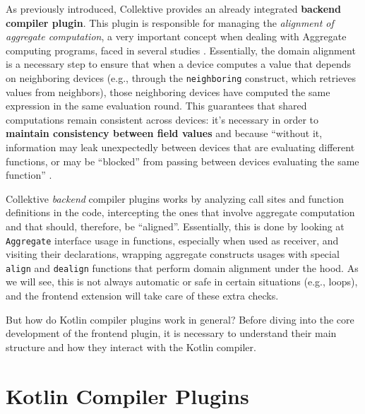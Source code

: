 \documentclass[12pt,a4paper,openright,twoside]{book}
\begin{document}
As previously introduced, Collektive provides an already integrated
\textbf{backend compiler plugin}. This plugin is responsible for managing the
\emph{alignment of aggregate computation}, a very important concept when dealing
with Aggregate computing programs, faced in several studies
\cite{DBLP:conf/forte/DamianiVPB15} \cite{DBLP:conf/saso/AudritoDVC16}.
%
Essentially, the domain alignment is a necessary step to ensure that when a
device computes a value that depends on neighboring devices (e.g., through the
\lstinline{neighboring} construct, which retrieves values from neighbors), those
neighboring devices have computed the same expression in the same evaluation
round. This guarantees that shared computations remain consistent across
devices: it's necessary in order to \textbf{maintain consistency between field
values} and  because ``without it, information
may leak unexpectedly between devices that are evaluating different functions,
or may be “blocked” from passing between devices evaluating the same function''
\cite{DBLP:conf/forte/DamianiVPB15}.

Collektive \emph{backend} compiler plugins works by analyzing call sites and
function definitions in the code, intercepting the ones that involve aggregate
computation and that should, therefore, be ``aligned''. Essentially, this is
done by looking at \lstinline{Aggregate} interface usage in functions,
especially when used as receiver, and visiting their declarations, wrapping
aggregate constructs usages with special \lstinline{align} and
\lstinline{dealign} functions that perform domain alignment under the hood.
%
As we will see, this is not always automatic or safe in certain situations 
(e.g., loops), and the frontend extension will take care of these extra 
checks. 

But how do Kotlin compiler plugins work in general? Before diving into the 
core development of the frontend plugin, it is necessary to understand their
main structure and how they interact with the Kotlin compiler.

\section{Kotlin Compiler Plugins} 
\end{document}
